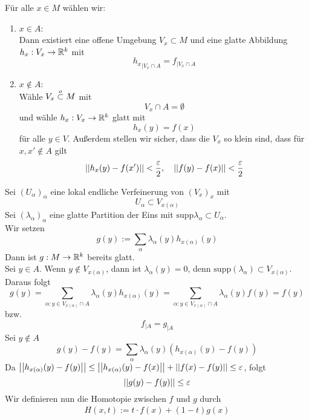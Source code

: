 \begin{Beweis}{}
	Für alle $x \in M$ wählen wir:
	\begin{enumerate}
		\item $x \in A$:\\
		Dann existiert eine offene Umgebung $V_x\subset M$ und eine glatte Abbildung $h_x : V_x \overset{}{\rightarrow} \mathbb{R}^k$ mit
		\[ {h_x}_{|V_x \cap A} = f_{|V_x\cap A} \]
		\item $x\notin A:$\\
		Wähle $V_x\overset{o}{\subset} M$ mit
		\[ V_x \cap A = \emptyset \]
		und wähle $h_x : V_x \overset{}{\rightarrow} \mathbb{R}^k$ glatt mit
		\[ h_x(y) = f(x) \]
		für alle $y \in V$. Außerdem stellen wir sicher, dass die $V_x$ so klein sind, dass für $x, x' \notin A$ gilt
		\[ \left|\left|h_x(y) - f(x')\right|\right| < \frac{\varepsilon}{2}, ~~~ \left|\left|f(y) - f(x)\right|\right|< \frac{\varepsilon}{2} \]
	\end{enumerate}
Sei $(U_\alpha)_\alpha$ eine lokal endliche Verfeinerung von $(V_x)_x$ mit
\[ U_{\alpha} \subset V_{x(\alpha)} \]
Sei $(\lambda_\alpha)_\alpha$ eine glatte Partition der Eins mit $\text{supp}\lambda_\alpha \subset U_\alpha$.\\
Wir setzen
\[ g(y) := \sum_{\alpha}\lambda_\alpha(y) h_{x(\alpha)}(y) \]
Dann ist $g : M \overset{}{\rightarrow} \mathbb{R}^k$ bereits glatt.\\
Sei $y \in A$. Wenn $y \notin V_{x(\alpha)}$, dann ist $\lambda_\alpha(y) = 0$, denn $\text{supp}(\lambda_\alpha) \subset V_{x(\alpha)}$. Daraus folgt
\[ g(y) = \sum_{\alpha : y \in V_{x(\alpha)}\cap A} \lambda_\alpha(y) h_{x(\alpha)}(y) = \sum_{\alpha : y \in V_{x(\alpha)}\cap A} \lambda_\alpha(y)f(y) = f(y) \]
bzw.
\[ f_{|A} = g_{|A} \]
Sei $y \notin A$
\[ g(y) - f(y) = \sum_{\alpha} \lambda_\alpha(y) (h_{x(\alpha)}(y) - f(y)) \]
Da $\left|\left|h_{x(\alpha)}(y) - f(y)\right|\right| \leq \left|\left|h_{x(\alpha)}(y) - f(x)\right|\right| + \left|\left|f(x)- f(y)\right|\right| \leq \varepsilon$, folgt
\[ \left|\left|g(y) - f(y)\right|\right| \leq \varepsilon \]
Wir definieren nun die Homotopie zwischen $f$ und $g$ durch
\begin{align*}
H(x,t) := t\cdot f(x) + (1- t) g(x)
\end{align*}
\end{Beweis}

